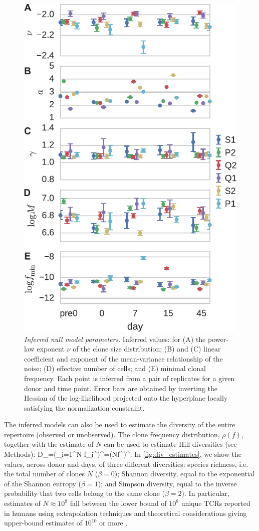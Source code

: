 \begin{figure}
\includegraphics[width=.8\linewidth]{fig3_learnednullparas}
\centering{}
\caption{
  \emph{Inferred null model parameters}. Inferred values: for (A) the power-law exponent $\nu$ of the clone size distribution; (B) and (C) linear coefficient and exponent of the mean-variance relationship of the noise; (D) effective number of cells; and (E) minimal clonal frequency.
  Each point is inferred from a pair of replicates for a given donor and time point. Error bars are obtained by inverting the Hessian of the log-likelihood projected onto the hyperplane locally satisfying the normalization constraint.
\label{fig:nullparas_timeseries}}
\end{figure}


The inferred models can also be used to estimate the diversity of the entire repertoire (observed or unobserved).
The clone frequency distribution, $\rho(f)$, together with the estimate of $N$ can be used to estimate Hill diversities (see Methods):
\beq
D_\beta={\left(\sum_{i=1}^N f_i^\beta\right)}^{}={\left(N\<f^\beta\>\right)}^{}.
\eeq
In  \cref{fig:div_estimates}, we show the values, across donor and days, of three different diversities: species richness, i.e. the total number of clones $N$ ($\beta=0$); Shannon diversity, equal to the exponential of the Shannon entropy ($\beta=1$); and Simpson diversity, equal to the inverse probability that two cells belong to the same clone ($\beta=2$). In particular, estimates of $N\approx 10^9$ fall between the lower bound of $10^8$ unique TCRs reported in humans using extrapolation techniques \cite{Qi2014} and theoretical considerations giving upper-bound estimates of $10^{10}$ \cite{Lythe2016} or more \cite{Mora2019}.


